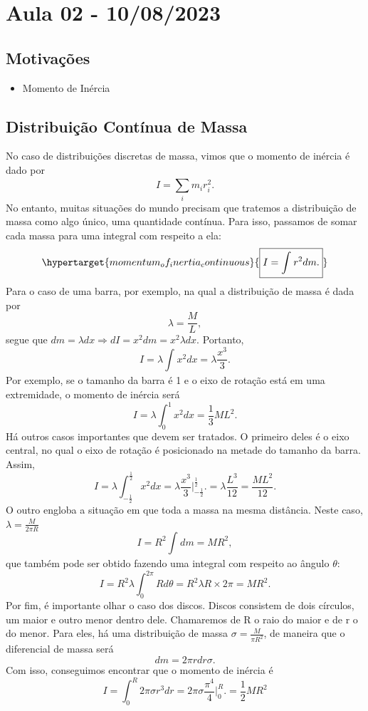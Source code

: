 \documentclass{article}
\begin{document}
\section{Aula 02 - 10/08/2023}
\subsection{Motivações}
\begin{itemize}
  \item Momento de Inércia
\end{itemize}
\subsection{Distribuição Contínua de Massa}
No caso de distribuições discretas de massa, vimos que o momento de inércia é dado por 
\[
  I=\sum\limits_{i}^{}m_{i}r_{i}^{2}.
\]
No entanto, muitas situações do mundo precisam que tratemos a distribuição de massa como algo único, uma
quantidade contínua. Para isso, passamos de somar cada massa para uma integral com respeito a ela: 
\[
  \hypertarget{momentum_of_inertia_continuous}{\boxed{I = \int_{}^{}r^{2}dm.}}
\]
Para o caso de uma barra, por exemplo, na qual a distribuição de massa é dada por 
\[
  \lambda = \frac{M}{L},
\]
segue que \(dm = \lambda dx \Rightarrow dI = x^{2}dm = x^{2}\lambda dx\). Portanto, 
\[
  I = \lambda \int_{}^{}x^{2}dx = \lambda \frac{x^{3}}{3}.
\]
Por exemplo, se o tamanho da barra é 1 e o eixo de rotação está em uma extremidade, o momento de inércia será 
\[
  I = \lambda \int_{0}^{1}x^{2}dx =\frac{1}{3}ML^{2}.
\]
Há outros casos importantes que devem ser tratados. O primeiro deles é o eixo central,
no qual o eixo de rotação é posicionado na metade do tamanho da barra. Assim, 
\[
  I = \lambda \int_{-\frac{1}{2}}^{\frac{1}{2}}x^{2}dx = \lambda \frac{x^{3}}{3}\biggl|_{-\frac{1}{2}}^{\frac{1}{2}}\biggr. = \lambda \frac{L^{3}}{12} = \frac{ML^{2}}{12}.
\]
O outro engloba a situação em que toda a massa na mesma distância. Neste caso, \(\lambda = \frac{M}{2\pi R}\)
\[
  I = R^{2} \int_{}^{}dm = MR^{2}, 
\]
que também pode ser obtido fazendo uma integral com respeito ao ângulo \(\theta \): 
\[
  I = R^{2}\lambda \int_{0}^{2\pi } R d\theta = R^{2}\lambda R\times2\pi = MR^{2}.
\]
Por fim, é importante olhar o caso dos discos. Discos consistem de dois círculos, um maior e outro menor dentro dele.
Chamaremos de R o raio do maior e de r o do menor. Para eles, há uma distribuição de massa
\(\sigma = \frac{M}{\pi R^{2}}\), de maneira que o diferencial de massa será 
\[
  dm = 2\pi r dr\sigma.
\]
Com isso, conseguimos encontrar que o momento de inércia é 
\[
  I = \int_{0}^{R}2\pi \sigma r^{3}dr = 2\pi \sigma \frac{\pi^{4}}{4}\biggl|_{0}^{R}\biggr. = \frac{1}{2}MR^{2}
\]
\end{document}
